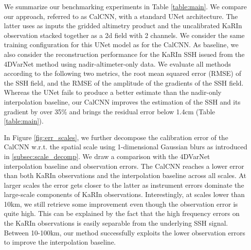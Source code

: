 \begin{bibunit}
We summarize our benchmarking experiments in Table \ref{table:main}.
We compare our approach, referred to as CalCNN, with a standard UNet \cite{Ronneberger_Fischer_Brox_2015} architecture. The latter uses as inputs the gridded altimetry product and the uncalibrated KaRIn observation stacked together as a 2{\sc d} field with 2 channels. We consider the same training configuration for this UNet model as for the CalCNN.
As baseline, we also consider the reconstruction performance for the KaRIn SSH issued from the 4DVarNet method using nadir-altimeter-only data. 
We evaluate all methods according to the following two metrics, the root mean squared error (RMSE) of the SSH field, and the RMSE of the amplitude of the gradients of the SSH field. 
Whereas the UNet fails to produce a better estimate than the nadir-only interpolation baseline, our CalCNN improves the estimation of the SSH and its gradient by over 35\% and brings the residual error below 1.4cm (Table \ref{table:main}).

In Figure \ref{fig:err_scales}, we further decompose the calibration error of the CalCNN w.r.t. the spatial scale using 1-dimensional Gaussian blurs as introduced in \ref{subsec:scale_decomp}. We draw a comparison with the 4DVarNet interpolation baseline and observation errors. The CalCNN reaches a lower error than both KaRIn observations and the interpolation baseline across all scales. At larger scales the error gets closer to the latter as instrument errors dominate the large-scale components of KaRIn observations. 
Interestingly, at scales lower than 10km, we still retrieve some improvement even though the observation error is quite high.
This can be explained by the fact that the high frequency errors on the KaRIn observations is easily separable from the underlying SSH signal.
Between 10-100km, our method successfully exploits the lower observation errors to improve the interpolation baseline.




\end{bibunit}

